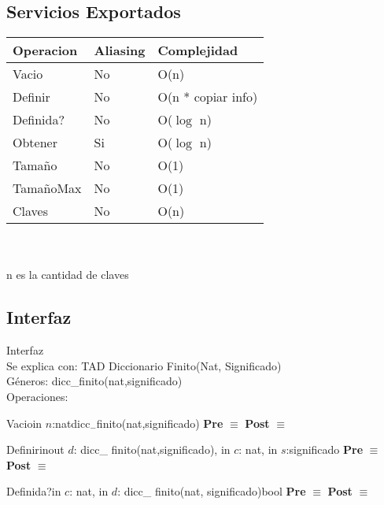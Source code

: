\subsection{Servicios Exportados}
\begin{tabular}[c]{|l|l|l|}
		\hline
		Operacion & Aliasing & Complejidad \\
		\hline
		Vacio & No & O(n) \\
		\hline
		Definir & No & O(n * copiar info)\\
		\hline
		Definida? & No & O($\log$ n)\\
		\hline
		Obtener & Si & O($\log$ n)\\
		\hline
		Tama\~no & No & O(1)\\
		\hline
		Tama\~noMax & No & O(1)\\
		\hline
		Claves & No & O(n)\\
		\hline
	
	\end{tabular}\\\\
n es la cantidad de claves\\

\subsection{Interfaz}
	\noindent Interfaz \\
	Se explica con: TAD Diccionario Finito(Nat, Significado)\\
	G\'{e}neros: dicc\_finito(nat,significado)\\
	Operaciones:\\
	\begin{interfaz}{Vacio}{in $n$:nat}{dicc$_-$finito(nat,significado)}{}
	\textbf{Pre} $\equiv$
	\textbf{Post} $\equiv$
	\end{interfaz}
	
	\begin{interfaz}{Definir}{inout $d$: dicc\_ finito(nat,significado), in $c$: nat, in $s$:significado}{}{}
	\textbf{Pre} $\equiv$
	\textbf{Post} $\equiv$
	\end{interfaz}
	
	\begin{interfaz}{Definida?}{in $c$: nat, in $d$: dicc\_ finito(nat, significado)}{bool}{}
	\textbf{Pre} $\equiv$
	\textbf{Post} $\equiv$
	\end{interfaz}
	
